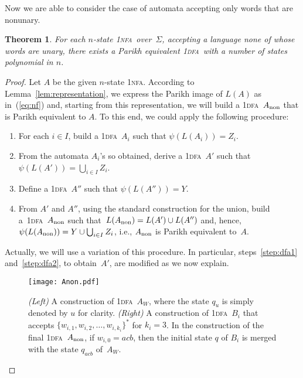 \documentclass[11pt]{article}
\newcommand*{\ow}{\textsc{1}}
\newcommand*{\owdfa}{\ow\textsc{dfa}}
\newcommand*{\ownfa}{\ow\textsc{nfa}}
\newtheorem{theorem}{Theorem}[section]
\begin{document}
Now we are able to consider the case of automata accepting only words that are nonunary.


\begin{theorem}\label{thm:nonunary_NFA_to_DFA}
	For each $n$-state \ownfa\ over~$\Sigma$, accepting a language none of whose words are unary, there exists a Parikh equivalent \owdfa\ with a number   
	of states polynomial in $n$. 
\end{theorem}
\begin{proof}
Let $A$ be the given $n$-state \ownfa. According to Lemma~\ref{lem:representation}, we express the Parikh image
of $L(A)$ as in~(\ref{eq:nf}) and, starting {}from this representation, we will build a \owdfa\ $A_{\rm non}$ 
that is Parikh equivalent to $A$.
To this end, we could apply the following procedure:
\begin{enumerate}
	\item\label{step:dfa1}For each $i\in I$, build a \owdfa\ $A_i$ such that $\psi(L(A_i))=Z_i$.
	\item\label{step:dfa2}{}From the automata $A_i$'s so obtained, derive a \owdfa\ $A'$ such that $\psi(L(A'))=\bigcup_{i \in I} Z_i$.
	\item\label{step:dfa3}Define a \owdfa\ $A''$ such that $\psi(L(A''))=Y$.
	\item\label{step:dfa4}From $A'$ and $A''$, using the standard construction for the union, build a~\owdfa~$A_{\rm non}$ such 
	that~$L(A_{\rm non})=L(A')\cup L(A'')$ and, hence, $\psi(L(A_{\rm non}))=Y\cup\bigcup_{i \in I} Z_i$,
	i.e., $A_{\rm non}$ is Parikh equivalent to~$A$.
\end{enumerate}
Actually, we will use a variation of this procedure. In particular, steps~\ref{step:dfa1} and~\ref{step:dfa2}, to
obtain~$A'$, are modified as we now explain.

\begin{figure}[tb]
\begin{center}
\texttt{[image: Anon.pdf]}
\end{center}
\caption{
	\emph{(Left)} A construction of \owdfa\ $A_W$, where the state $q_u$ is simply denoted by $u$ for clarity. 
	\emph{(Right)} A construction of \owdfa\ $B_i$ that accepts $\{w_{i, 1}, w_{i, 2}, \ldots, w_{i, k_i}\}^*$ for $k_i= 3$.
	In the construction of the final \owdfa\ $A_{\rm non}$, if $w_{i, 0} = acb$, then the initial state $q$ of $B_i$ is merged with the state $q_{acb}$ of~$A_W$. 
} 
\label{fig:DFA}
\end{figure}

\smallskip


\end{proof}
\end{document}
